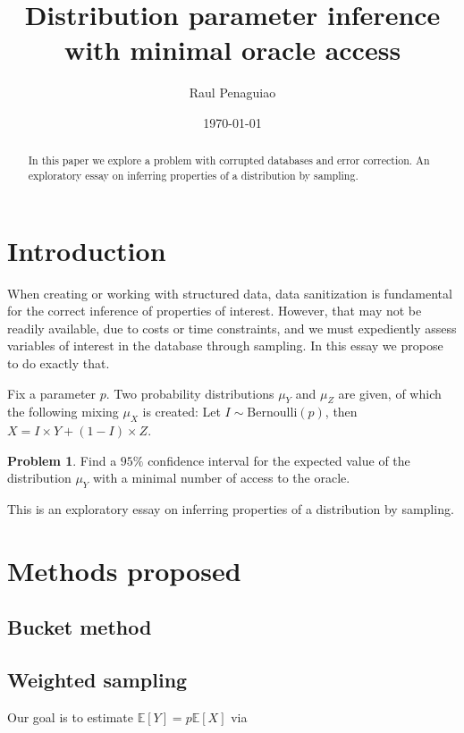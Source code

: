 \documentclass[a4paper]{amsart}
\title{Distribution parameter inference with minimal oracle access}
\date{\today}
\author{Raul Penaguiao}
\newcommand{\E}{\mathbb{E}}
\theoremstyle{definition}
\newtheorem{problem}[lemma]{Problem}
\theoremstyle{remark}
\newtheorem{to do}[lemma]{To Do}
\theoremstyle{remark}
\begin{document}
\begin{abstract}
In this paper we explore a problem with corrupted databases and error correction.
An exploratory essay on inferring properties of a distribution by sampling.
\end{abstract}

\maketitle




\section{Introduction}

When creating or working with structured data, data sanitization is fundamental for the correct inference of properties of interest.
However, that may not be readily available, due to costs or time constraints, and we must expediently assess variables of interest in the database through sampling.
In this essay we propose to do exactly that.

Fix a parameter $p$.
Two probability distributions $\mu_Y$ and $\mu_Z$ are given, of which the following mixing $\mu_X$ is created:
Let $I \sim \mathrm{Bernoulli}(p)$, then $X = I \times Y + (1 - I) \times Z$.



\begin{problem}
Find a $95 \%$ confidence interval for the expected value of the distribution $\mu_Y$ with a minimal number of access to the oracle.
\end{problem}


This is an exploratory essay on inferring properties of a distribution by sampling.


\section{Methods proposed}


\subsection{Bucket method}



\subsection{Weighted sampling}


Our goal is to estimate $\E [ Y ] = p \E [ X ]$ via 



\end{document}
